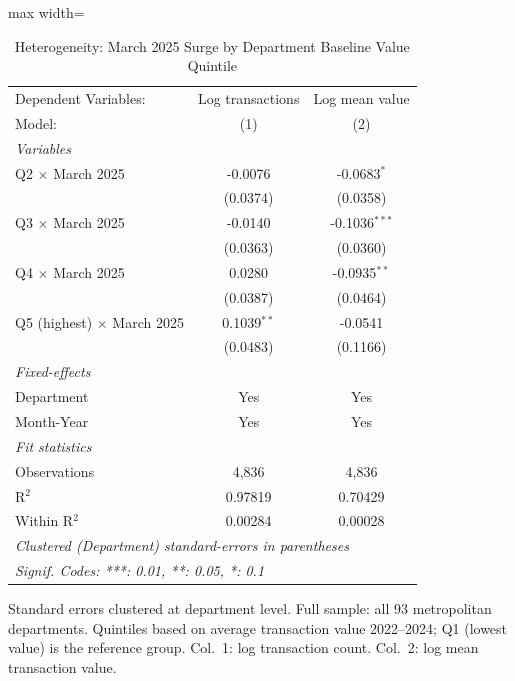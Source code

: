 \begin{table}[htbp]
   \caption{\label{tab:hetero} Heterogeneity: March 2025 Surge by Department Baseline Value Quintile}
   \centering
   \begin{adjustbox}{max width=\textwidth}
   \begin{tabular}{lcc}
      \tabularnewline \midrule \midrule
      Dependent Variables:              & Log transactions & Log mean value\\  
      Model:                            & (1)              & (2)\\  
      \midrule
      \emph{Variables}\\
      Q2 $\times$ March 2025            & -0.0076          & -0.0683$^{*}$\\   
                                        & (0.0374)         & (0.0358)\\   
      Q3 $\times$ March 2025            & -0.0140          & -0.1036$^{***}$\\   
                                        & (0.0363)         & (0.0360)\\   
      Q4 $\times$ March 2025            & 0.0280           & -0.0935$^{**}$\\   
                                        & (0.0387)         & (0.0464)\\   
      Q5 (highest) $\times$ March 2025  & 0.1039$^{**}$    & -0.0541\\   
                                        & (0.0483)         & (0.1166)\\   
      \midrule
      \emph{Fixed-effects}\\
      Department                        & Yes              & Yes\\  
      Month-Year                        & Yes              & Yes\\  
      \midrule
      \emph{Fit statistics}\\
      Observations                      & 4,836            & 4,836\\  
      R$^2$                             & 0.97819          & 0.70429\\  
      Within R$^2$                      & 0.00284          & 0.00028\\  
      \midrule \midrule
      \multicolumn{3}{l}{\emph{Clustered (Department) standard-errors in parentheses}}\\
      \multicolumn{3}{l}{\emph{Signif. Codes: ***: 0.01, **: 0.05, *: 0.1}}\\
   \end{tabular}
   \end{adjustbox}

   \par \raggedright
   Standard errors clustered at department level. Full sample: all 93 metropolitan departments. Quintiles based on average transaction value 2022--2024; Q1 (lowest value) is the reference group. Col.~1: log transaction count. Col.~2: log mean transaction value.
\end{table}
